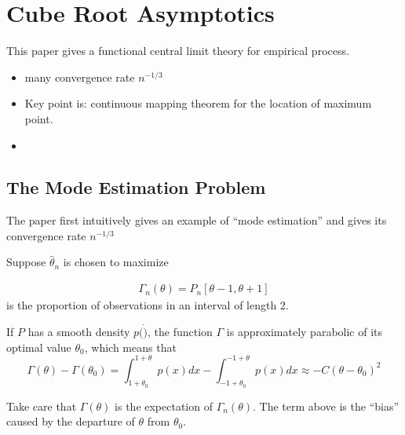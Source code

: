\section{Cube Root Asymptotics}
This paper gives a functional central limit theory for empirical process.

\begin{itemize}
  \item many convergence rate $n^{-1/3}$
  \item Key point is: continuous mapping theorem for the location of maximum point.
  \item 
\end{itemize}






\subsection{The Mode Estimation Problem}

The paper first intuitively gives an example of ``mode estimation'' and gives its convergence rate $n^{-1/3}$

Suppose $\hat \theta_n$ is chosen to maximize

\begin{align}
    \Gamma_n(\theta) = P_n[\theta - 1,\theta + 1]
\end{align}
is the proportion of observations in an interval of length 2.

If $P$ has a smooth density $p(\dot)$,
the function $\Gamma$ is approximately parabolic of its optimal value $\theta_0$, which means that 
$$
\Gamma(\theta)-\Gamma\left(\theta_0\right)=\int_{1+\theta_0}^{1+\theta} p(x) d x-\int_{-1+\theta_0}^{-1+\theta} p(x) d x \approx-C \left(\theta-\theta_0\right)^2
$$

\begin{summary}
  Take care that $\Gamma(\theta)$ is the expectation of $\Gamma_n(\theta)$.
  The term above  is the ``bias'' caused by the departure of $\theta$ from $\theta_0$.
\end{summary}

